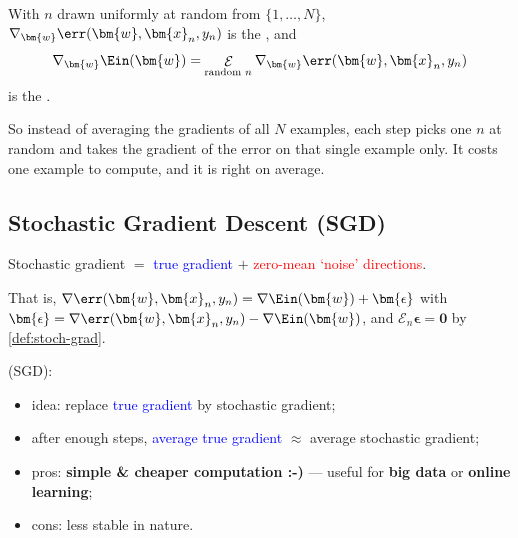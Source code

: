 \begin{definition}\label{def:stoch-grad}
    With \(n\) drawn uniformly at random from \(\{1, \dots , N\}\),
    \(\nabla_{\bm{w}} \err(\bm{w}, \bm{x}_n, y_n)\) is the , and
    \[
        \nabla_{\bm{w}} \Ein(\bm{w}) = \mathop{\mathcal{E}}_{\text{random } n}
        \nabla_{\bm{w}} \err(\bm{w}, \bm{x}_n, y_n)
    \]
    is the .
\end{definition}

So instead of averaging the gradients of all \(N\) examples, each step picks
one \(n\) at random and takes the gradient of the error on that single example
only. It costs one example to compute, and it is right on average.

\subsection{Stochastic Gradient Descent (SGD)}

\begin{moral}
    \textcolor{orange!85!black}{Stochastic gradient} \(=\)
    \textcolor{blue}{true gradient} \(+\) \textcolor{red}{zero-mean `noise'
    directions}.
\end{moral}

That is, \(\nabla \err(\bm{w}, \bm{x}_n, y_n) = \nabla \Ein(\bm{w}) +
\bm{\epsilon}\) with \(\bm{\epsilon} = \nabla \err(\bm{w}, \bm{x}_n, y_n) -
\nabla \Ein(\bm{w})\), and \(\mathcal{E}_n \bm{\epsilon} = \bm{0}\) by
\autoref{def:stoch-grad}.

\begin{definition}\label{def:sgd}
     (SGD):
    \begin{itemize}
        \item idea: replace \textcolor{blue}{true gradient} by
            \textcolor{orange!85!black}{stochastic gradient};
        \item after enough steps, \textcolor{blue}{average true gradient}
            \(\approx\) \textcolor{orange!85!black}{average stochastic
            gradient};
        \item pros: \textcolor{orange!85!black}{\textbf{simple \& cheaper
            computation :-)}} --- useful for
            \textcolor{orange!85!black}{\textbf{big data}} or
            \textcolor{orange!85!black}{\textbf{online learning}};
        \item cons: less stable in nature.
    \end{itemize}
\end{definition}

